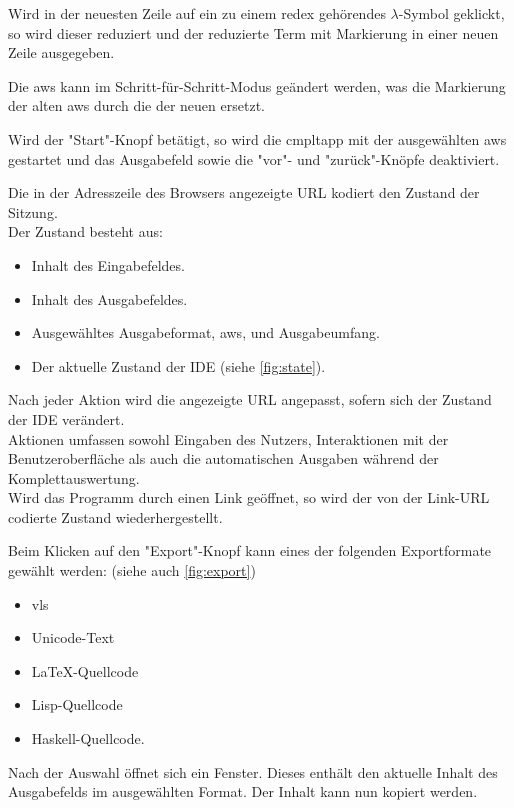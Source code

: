 \documentclass[parskip=full,11pt,twoside]{scrartcl}
\begin{document}
Wird in der neuesten Zeile auf ein zu einem \gls{redex} gehörendes $\lambda$-Symbol geklickt, so wird dieser reduziert und der reduzierte Term mit Markierung in einer neuen Zeile ausgegeben.

Die \gls{aws} kann im Schritt-für-Schritt-Modus geändert werden, was die Markierung der alten \gls{aws} durch die der neuen ersetzt.

Wird der "Start"-Knopf betätigt, so wird die \gls{cmpltapp} mit der ausgewählten \gls{aws} gestartet und das Ausgabefeld sowie die "vor"- und "zurück"-Knöpfe deaktiviert.

Die in der Adresszeile des Browsers angezeigte URL kodiert den Zustand der Sitzung.\\
Der Zustand besteht aus:
\begin{itemize}
	\item Inhalt des Eingabefeldes.
	\item Inhalt des Ausgabefeldes.
	\item Ausgewähltes Ausgabeformat, \gls{aws}, und Ausgabeumfang.
	\item Der aktuelle Zustand der IDE (siehe \cref{fig:state}).
\end{itemize}
Nach jeder Aktion wird die angezeigte URL angepasst, sofern sich der Zustand der IDE verändert.\\
Aktionen umfassen sowohl Eingaben des Nutzers, Interaktionen mit der Benutzeroberfläche als auch die automatischen Ausgaben während der Komplettauswertung.\\ 
Wird das Programm durch einen Link geöffnet, so wird der von der Link-URL codierte Zustand wiederhergestellt.

Beim Klicken auf den "Export"-Knopf kann eines der folgenden Exportformate gewählt werden: (siehe auch \cref{fig:export})
\begin{itemize}
	\item \gls{vls}
	\item Unicode-Text
	\item \LaTeX-Quellcode
	\item Lisp-Quellcode
	\item Haskell-Quellcode.
\end{itemize}
Nach der Auswahl öffnet sich ein Fenster.
Dieses enthält den aktuelle Inhalt des Ausgabefelds im ausgewählten Format.
Der Inhalt kann nun kopiert werden.
\end{document}
